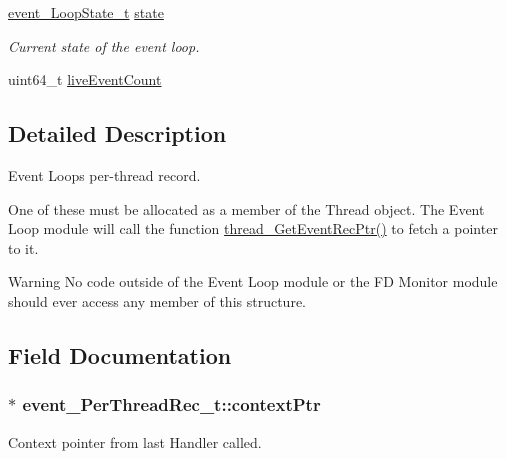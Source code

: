\begin{DoxyCompactItemize}
\hyperlink{event_loop_8h_a00c2459b2b9d5f391c340399cba953ee}{event\+\_\+\+Loop\+State\+\_\+t} \hyperlink{structevent___per_thread_rec__t_a19c485f81539bfdfe8092178510af8d4}{state}
\begin{DoxyCompactList}\small\item\em Current state of the event loop. \end{DoxyCompactList}\item 
uint64\+\_\+t \hyperlink{structevent___per_thread_rec__t_a8c08fbd7cf94a02fd532104dadfa49c8}{live\+Event\+Count}
\end{DoxyCompactItemize}


\subsection{Detailed Description}
Event Loop\textquotesingle{}s per-\/thread record.

One of these must be allocated as a member of the Thread object. The Event Loop module will call the function \hyperlink{thread_8c_a5938f5ecc8545e73e10e8d1f17f73c87}{thread\+\_\+\+Get\+Event\+Rec\+Ptr()} to fetch a pointer to it.

\begin{DoxyWarning}{Warning}
No code outside of the Event Loop module or the FD Monitor module should ever access any member of this structure. 
\end{DoxyWarning}


\subsection{Field Documentation}
\subsubsection[{\texorpdfstring{context\+Ptr}{contextPtr}}]{$\ast$ event\+\_\+\+Per\+Thread\+Rec\+\_\+t\+::context\+Ptr}\hypertarget{structevent___per_thread_rec__t_a2fdc816618fb28f6cddfa191d9339e7b}{}\label{structevent___per_thread_rec__t_a2fdc816618fb28f6cddfa191d9339e7b}


Context pointer from last Handler called. 


